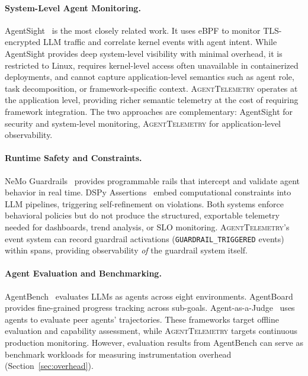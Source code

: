 \documentclass[sigconf,nonacm]{acmart}
\begin{document}
\paragraph{System-Level Agent Monitoring.}
AgentSight~\cite{agentsight} is the most closely related work.  It uses
eBPF to monitor TLS-encrypted LLM traffic and correlate kernel events
with agent intent.  While AgentSight provides deep system-level
visibility with minimal overhead, it is restricted to Linux, requires
kernel-level access often unavailable in containerized deployments,
and cannot capture application-level semantics such as agent role,
task decomposition, or framework-specific context.
\textsc{AgentTelemetry} operates at the application level, providing
richer semantic telemetry at the cost of requiring framework integration.
The two approaches are complementary: AgentSight for security and
system-level monitoring, \textsc{AgentTelemetry} for application-level
observability.

\paragraph{Runtime Safety and Constraints.}
NeMo Guardrails~\cite{nemo_guardrails} provides programmable rails that
intercept and validate agent behavior in real time.  DSPy
Assertions~\cite{dspy_assertions} embed computational constraints into
LLM pipelines, triggering self-refinement on violations.  Both systems
enforce behavioral policies but do not produce the structured,
exportable telemetry needed for dashboards, trend analysis, or SLO
monitoring.  \textsc{AgentTelemetry}'s event system can record guardrail
activations (\texttt{GUARDRAIL\_TRIGGERED} events) within spans,
providing observability \emph{of} the guardrail system itself.

\paragraph{Agent Evaluation and Benchmarking.}
AgentBench~\cite{agentbench} evaluates LLMs as agents across eight
environments.  AgentBoard~\cite{agentboard} provides fine-grained
progress tracking across sub-goals.  Agent-as-a-Judge~\cite{agent_as_judge}
uses agents to evaluate peer agents' trajectories.  These frameworks
target offline evaluation and capability assessment, while
\textsc{AgentTelemetry} targets continuous production monitoring.
However, evaluation results from AgentBench can serve as benchmark
workloads for measuring instrumentation overhead (Section~\ref{sec:overhead}).
\end{document}
